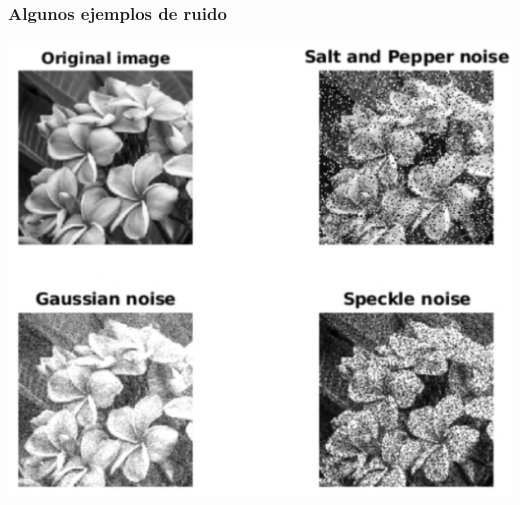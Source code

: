 \documentclass[
10pt, %
aspectratio=169, %
]{beamer}
\begin{document}
	\begin{frame}
		
		\frametitle{Algunos ejemplos de ruido}
		
		\centering
		\includegraphics[scale=0.4]{ruido.png}
		
		
		
		
		
	\end{frame}
	
\end{document}
